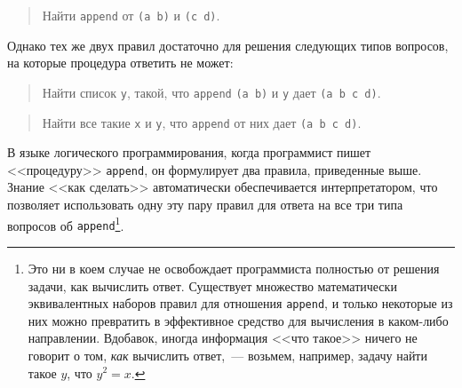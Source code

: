 \begin{quote}
Найти {\tt append} от {\tt (a b)} и
{\tt (c d)}.
\end{quote}
Однако тех же двух правил достаточно для решения следующих типов
вопросов, на которые процедура ответить не может:

\begin{quote}
Найти список {\tt y}, такой, что
{\tt append} {\tt (a b)} и {\tt y} дает {\tt (a b c d)}.
\end{quote}

\begin{quote}
Найти все такие {\tt x} и {\tt y}, что
{\tt append} от них дает {\tt (a b c d)}.
\end{quote}
В 
языке логического программирования, когда программист пишет <<процедуру>>
{\tt append}, он формулирует два правила, приведенные
выше. Знание <<как сделать>> автоматически обеспечивается
интерпретатором, что позволяет использовать одну эту пару правил для
ответа на все три типа вопросов об {\tt append}\footnote{Это ни в коем 
случае не освобождает программиста
полностью от решения задачи, как вычислить ответ.  Существует
множество математически эквивалентных наборов правил для отношения
{\tt append}, и только некоторые из них можно превратить в
эффективное средство для вычисления в каком-либо направлении.
Вдобавок, иногда информация <<что такое>> ничего не говорит о том,
{\em как} вычислить ответ,~--- возьмем, например, задачу найти такое
$y$, что $y^2 = x$.}.

